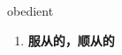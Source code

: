 
\begin{frame}
{\huge obedient}
\begin{center}
\begin{enumerate}\Large
  \item \textbf{服从的，顺从的}
\end{enumerate}
\end{center}
\end{frame}
